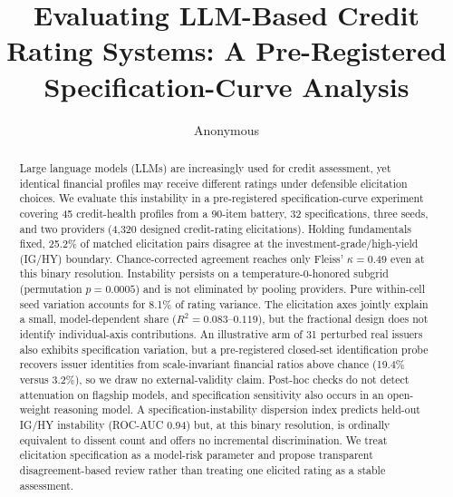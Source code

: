 \documentclass[a4paper,fleqn]{cas-sc}
\begin{document}
\let\WriteBookmarks\relax
\def\floatpagepagefraction{1}
\def\textpagefraction{.001}


\title[mode=title]{Evaluating LLM-Based Credit Rating Systems: A Pre-Registered Specification-Curve Analysis}

\author[1]{Anonymous}


\begin{abstract}
Large language models (LLMs) are increasingly used for credit assessment, yet identical financial
profiles may receive different ratings under defensible elicitation choices. We evaluate this
instability in a pre-registered specification-curve experiment covering 45 credit-health profiles
from a 90-item battery, 32 specifications, three seeds, and two providers (4{,}320 designed
credit-rating elicitations). Holding fundamentals fixed, 25.2\% of matched elicitation pairs
disagree at the investment-grade/high-yield (IG/HY) boundary. Chance-corrected agreement reaches
only Fleiss' $\kappa=0.49$ even at this binary resolution. Instability persists on a
temperature-0-honored subgrid (permutation $p=0.0005$) and is not eliminated by pooling providers.
Pure within-cell seed variation accounts for 8.1\% of rating variance. The elicitation axes jointly
explain a small, model-dependent share ($R^2=0.083$--$0.119$), but the fractional design does not
identify individual-axis contributions. An illustrative arm of 31 perturbed real issuers also
exhibits specification variation, but a pre-registered closed-set identification probe recovers
issuer identities from scale-invariant financial ratios above chance (19.4\% versus 3.2\%), so we
draw no external-validity claim. Post-hoc checks do not detect attenuation on flagship models, and
specification sensitivity also occurs in an open-weight reasoning model. A specification-instability dispersion index predicts held-out IG/HY instability (ROC-AUC 0.94) but, at this binary resolution, is ordinally equivalent to dissent count and offers no incremental discrimination. We treat elicitation specification as a
model-risk parameter and propose transparent disagreement-based review rather than treating one
elicited rating as a stable assessment.
\end{abstract}
\end{document}
